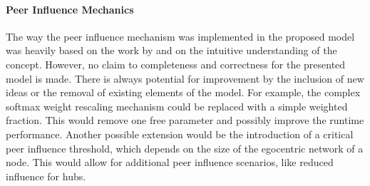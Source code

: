 \paragraph{Peer Influence Mechanics}
The way the peer influence mechanism was implemented in the proposed model was heavily based on the work by \citet{Walk2016} and on the intuitive understanding of the concept.
However, no claim to completeness and correctness for the presented model is made.
There is always potential for improvement by the inclusion of new ideas or the removal of existing elements of the model.
For example, the complex softmax weight rescaling mechanism could be replaced with a simple weighted fraction.
This would remove one free parameter and possibly improve the runtime performance.
Another possible extension would be the introduction of a critical peer influence threshold, which depends on the size of the egocentric network of a node.
This would allow for additional peer influence scenarios, like reduced influence for hubs.
